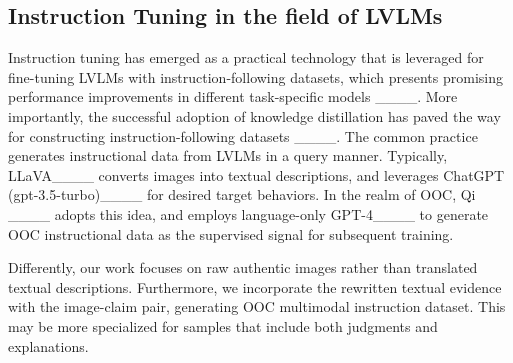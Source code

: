 \subsection{Instruction Tuning in the field of LVLMs}
Instruction tuning has emerged as a practical technology that is leveraged for fine-tuning LVLMs with instruction-following datasets, which presents promising performance improvements in different task-specific models ____. More importantly, the successful adoption of knowledge distillation has paved the way for constructing instruction-following datasets ____. The common practice generates instructional data from LVLMs in a query manner. Typically, LLaVA____ converts images into textual descriptions, and leverages ChatGPT (gpt-3.5-turbo)____ for desired target behaviors. In the realm of OOC, Qi \etal____ adopts this idea, and employs language-only GPT-4____ to generate OOC instructional data as the supervised signal for subsequent training.

Differently, our work focuses on raw authentic images rather than translated textual descriptions. Furthermore, we incorporate the rewritten textual evidence with the image-claim pair, generating OOC multimodal instruction dataset. This may be more specialized for samples that include both judgments and explanations.